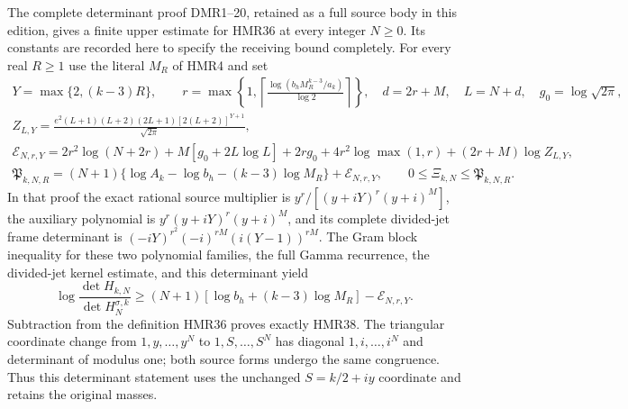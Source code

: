 \documentclass[11pt,a4paper]{article}
\begin{document}
The complete determinant proof DMR1--20, retained as a full
source body in this edition, gives a finite upper estimate
for HMR36 at every integer $N\geq0$. Its constants are recorded
here to specify the receiving bound completely. For every
real $R\geq1$ use the literal $M_R$ of HMR4 and set
\[
\begin{gathered}
 Y=\max\{2,(k-3)R\},\qquad
 r=\max\left\{1,\left\lceil
 \frac{\log(b_hM_R^{k-3}/a_k)}{\log2}\right\rceil\right\},
 \quad d=2r+M,\quad L=N+d,\quad g_0=\log\sqrt{2\pi},\\
 Z_{L,Y}=\frac{e^2(L+1)(L+2)(2L+1)
                   [2(L+2)]^{Y+1}}{\sqrt{2\pi}},\\
 \mathcal E_{N,r,Y}
 =2r^2\log(N+2r)+M[g_0+2L\log L]+2rg_0
   +4r^2\log\max(1,r)+(2r+M)\log Z_{L,Y},\\
 \mathfrak P_{k,N,R}
 =(N+1)\{\log A_k-\log b_h-(k-3)\log M_R\}
       +\mathcal E_{N,r,Y},\qquad
 0\leq\Xi_{k,N}\leq\mathfrak P_{k,N,R}.
\end{gathered}\tag{HMR38}
\]
In that proof the exact rational source multiplier is
$y^r/[(y+iY)^r(y+i)^M]$, the auxiliary polynomial is
$y^r(y+iY)^r(y+i)^M$, and its complete divided-jet frame
determinant is
$(-iY)^{r^2}(-i)^{rM}(i(Y-1))^{rM}$.
The Gram block inequality for these two polynomial families,
the full Gamma recurrence, the divided-jet kernel estimate,
and this determinant yield
\[
 \log\frac{\det H_{k,N}}{\det H_N^{\sigma,k}}
 \geq(N+1)[\log b_h+(k-3)\log M_R]-\mathcal E_{N,r,Y}.
\]
Subtraction from the definition HMR36 proves exactly HMR38.
The triangular coordinate change from $1,y,\ldots,y^N$ to
$1,S,\ldots,S^N$ has diagonal $1,i,\ldots,i^N$ and determinant
of modulus one; both source forms undergo the same congruence.
Thus this determinant statement uses the unchanged $S=k/2+iy$
coordinate and retains the original masses.
\end{document}
